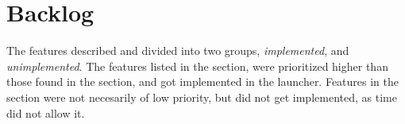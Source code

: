 \chapter{Backlog}
\label{chap:backlog}

The features described and divided into two groups, \emph{implemented}, and \emph{unimplemented}.
The features listed in the  section, were prioritized higher than those found in the  section, and got implemented in the launcher. Features in the  section were not necesarily of low priority, but did not get implemented, as time did not allow it. 




